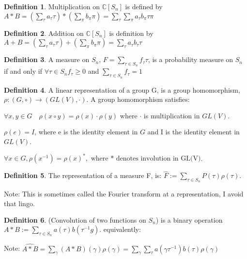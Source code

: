 \documentclass{article}
\theoremstyle{definition}
\newtheorem{definition}{Definition}
\begin{document}
\begin{definition} Multiplication on $\mathbb{C}[S_n]$ is defined by $A*B = (\sum_{\tau} a_\tau \tau)*(\sum_{\pi} b_\pi \pi) = \sum_{\tau} \sum_{\pi} a_\tau b_\pi \tau \pi $ \end{definition}
\begin{definition} Addition on $\mathbb{C}[S_n]$ is definition by $A+B = (\sum_{\tau} a_\tau \tau) + (\sum_\pi b_\pi \pi) = \sum_\tau a_\tau b_\tau \tau$ \end{definition}
\begin{definition} A measure on $S_n$, $F = \sum_{\tau \in S_n} f_\tau \tau $, is a probability measure on $S_n$ if and only if $\forall \tau \in S_n f_\tau \geq 0 $ and $\sum_{\tau \in S_n} f_\tau = 1 $
\end{definition}

\begin{definition} A linear representation of a group G, is a group homomorphism, $\rho : (G,\circ) \rightarrow (GL(V),\cdot)$. A group homomorphism satisfies:
\item \(\forall x,y \in G \quad \rho(x\circ y) = \rho(x) \cdot \rho(y) \) where $\cdot $ is multiplication in $GL(V)$.
\item \( \rho(e) = I \), where e is the identity element in $G$ and I is the identity element in $ GL(V) $.
\item \( \forall x \in G, \rho(x^{-1}) = \rho(x)^*, \text{ where * denotes involution in GL(V)} \).
\end{definition}

\begin{definition}The representation of a measure F, is: $ \hat{F} := \sum_{\tau \in S_n} P(\tau) \rho(\tau) $. \end{definition}
Note: This is sometimes called the Fourier transform at a representation, I avoid that lingo. 

\begin{definition}(Convolution of two functions on $S_n$) is a binary operation $ A * B := \sum_{\tau \in S_n} a(\tau) b(\tau^{-1}g) $. equivalently:
\end{definition}

Note: $ \widehat{A*B} = \sum_{\gamma} (A*B)(\gamma)\rho(\gamma) 
= \sum_{\gamma } \sum_{\tau} a(\gamma \tau^{-1})b(\tau)\rho(\gamma ) $
\end{document}
